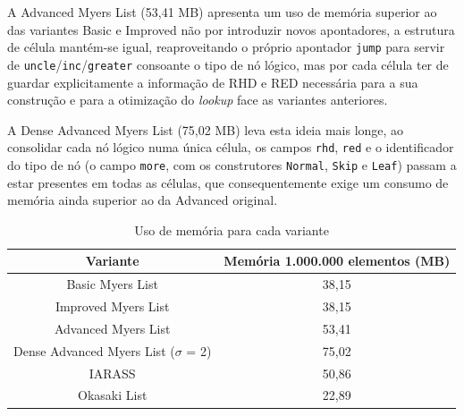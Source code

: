 A Advanced Myers List (53,41 MB) apresenta um uso de memória superior ao das variantes Basic e Improved não por introduzir novos apontadores, 
a estrutura de célula mantém-se igual, reaproveitando o próprio apontador \texttt{jump} para servir de \texttt{uncle}/\texttt{inc}/\texttt{greater} consoante o tipo de nó lógico, mas por 
cada célula ter de guardar explicitamente a informação de RHD e RED necessária para a sua construção e para a otimização do \textit{lookup} face as variantes anteriores. 

A Dense Advanced Myers List (75,02 MB) leva esta ideia mais longe, ao consolidar cada nó lógico numa única célula, os campos \texttt{rhd}, \texttt{red} e o  identificador do 
tipo de nó (o campo \texttt{more}, com os construtores \texttt{Normal}, \texttt{Skip} e \texttt{Leaf}) passam a estar presentes em todas as células, que consequentemente exige um consumo de memória ainda
superior ao da Advanced original.


\begin{table}[H]
    \centering
    \begin{tabular}{cc}
        \textbf{Variante} & \textbf{Memória 1.000.000 elementos (MB)} \\
        \hline
         Basic Myers List & 38,15\\
         \hline
         Improved Myers List & 38,15\\
         \hline
         Advanced Myers List & 53,41\\
         \hline
         Dense Advanced Myers List ($\sigma$ = 2) & 75,02\\
         \hline
         IARASS & 50,86\\
         \hline
         Okasaki List & 22,89\\
         \hline
    \end{tabular}
    \caption{Uso de memória para cada variante}
    \label{tab:memoria}
\end{table}


